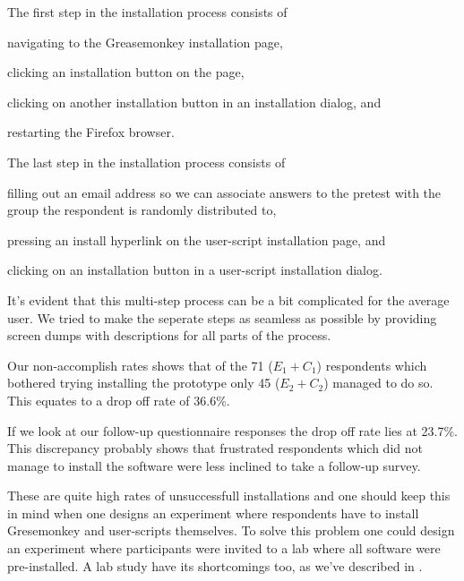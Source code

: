 The first step in the installation process consists of
\begin{inparaenum}[(i)]
  \item navigating to the Greasemonkey installation page,
  \item clicking an installation button on the page,
  \item clicking on another installation button in an installation
    dialog, and
  \item restarting the Firefox browser.
\end{inparaenum}
The last step in the installation process consists of
\begin{inparaenum}[(i)]
  \item filling out an email address so we can associate answers
    to the pretest with the group the respondent is randomly distributed to,
  \item pressing an install hyperlink on the user-script installation page,
    and
  \item clicking on an installation button in a user-script installation
    dialog.
\end{inparaenum}
It's evident that this multi-step process can be a bit complicated for the
average user. We tried to make the seperate steps as seamless as possible
by providing screen dumps with descriptions for all parts of the process.

Our non-accomplish rates%
shows that of the 71 ($E_1 + C_1$) respondents which bothered trying
installing the prototype only 45 ($E_2 + C_2$) managed to do so. This equates
to a drop off rate of 36.6\%.

If we look at our follow-up questionnaire responses%
the drop off rate lies at 23.7\%. This discrepancy probably shows that
frustrated respondents which did not manage to install the software were less
inclined to take a follow-up survey.

These are quite high rates of unsuccessfull
installations and one should keep this in mind when one designs an
experiment where respondents have to install Gresemonkey and user-scripts
themselves. To solve this problem one could design an experiment where
participants were invited to a lab where all software were pre-installed. A
lab study have its shortcomings too, as we've described in
.

